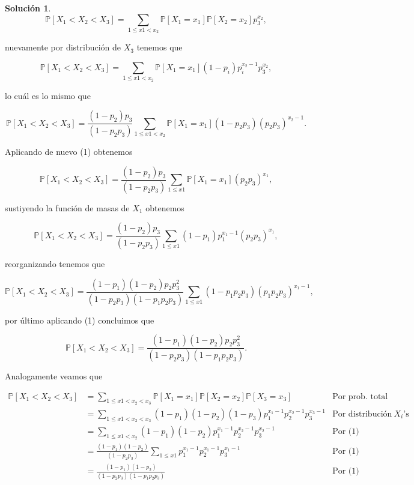 \documentclass[letterpaper]{article}
\theoremstyle{definition}
\theoremstyle{lemathm}
\theoremstyle{lemathm}
\newtheorem{sol}{Solución}
\theoremstyle{lemathm}
\theoremstyle{lemademthm}
\newcommand{\pars}[1]{\left( #1 \right) }
\newcommand{\bracs}[1]{\left[ #1 \right] }
\newcommand{\PP}{\mathbb{P}}
\newcommand{\1}{\mathbbm{1}}
\begin{document}
\begin{enumerate}
\begin{sol}
			\[\PP\bracs{X_1 < X_2 < X_3} = \sum_{1 \leq x1 < x_2} \PP\bracs{X_1 = x_1}\PP\bracs{X_2 = x_2}p_3^{x_2},\]

			nuevamente por distribución de $X_3$ tenemos que

			\[\PP\bracs{X_1 < X_2 < X_3} = \sum_{1 \leq x1 < x_2} \PP\bracs{X_1 = x_1}\pars{1-p_i}p_i^{x_2-1}p_3^{x_2},\]

			lo cuál es lo mismo que

			\[\PP\bracs{X_1 < X_2 < X_3} = \frac{\pars{1-p_2}p_3}{\pars{1-p_2p_3}}\sum_{1 \leq x1 < x_2} \PP\bracs{X_1 = x_1}\pars{1-p_2p_3}\pars{p_2p_3}^{x_2-1}.\]

			Aplicando de nuevo (1) obtenemos

			\[\PP\bracs{X_1 < X_2 < X_3} = \frac{\pars{1-p_2}p_3}{\pars{1-p_2p_3}}\sum_{1 \leq x1} \PP\bracs{X_1 = x_1}\pars{p_2p_3}^{x_1},\]

			sustiyendo la función de masas de $X_1$ obtenemos

			\[\PP\bracs{X_1 < X_2 < X_3} = \frac{\pars{1-p_2}p_3}{\pars{1-p_2p_3}}\sum_{1 \leq x1} \pars{1-p_1}p_1^{x_1-1}\pars{p_2p_3}^{x_1},\]

			reorganizando tenemos que

			\[\PP\bracs{X_1 < X_2 < X_3} = \frac{\pars{1-p_1}\pars{1-p_2}p_2p_3^2}{\pars{1-p_2p_3}\pars{1-p_1p_2p_3}}\sum_{1 \leq x1} \pars{1-p_1p_2p_3}\pars{p_1p_2p_3}^{x_1-1},\]

			por último aplicando (1) concluimos que

			\[\PP\bracs{X_1 < X_2 < X_3} = \frac{\pars{1-p_1}\pars{1-p_2}p_2p_3^2}{\pars{1-p_2p_3}\pars{1-p_1p_2p_3}}.\]

			Analogamente veamos que

			\begin{align*}
				\PP\bracs{X_1 < X_2 < X_3} &= \sum_{1\leq x1 < x_2 < x_3} \PP\bracs{X_1 = x_1}\PP\bracs{X_2 = x_2}\PP\bracs{X_3 = x_3} & \text{Por prob. total e indep.}\\
				&= \sum_{1\leq x1 < x_2 < x_3} \pars{1-p_1}\pars{1-p_2}\pars{1-p_3}p_1^{x_1-1}p_2^{x_2-1}p_3^{x_3-1} & \text{Por distribución de las $X_i$'s}\\
				&= \sum_{1\leq x1 < x_2} \pars{1-p_1}\pars{1-p_2}p_1^{x_1-1}p_2^{x_2-1}p_3^{x_2-1} & \text{Por (1)}\\
				&= \frac{\pars{1-p_1}\pars{1-p_2}}{\pars{1-p_2p_3}}\sum_{1\leq x1} p_1^{x_1-1}p_2^{x_1-1}p_3^{x_1-1} & \text{Por (1)}\\
				&= \frac{\pars{1-p_1}\pars{1-p_2}}{\pars{1-p_2p_3}\pars{1-p_1p_2p_3}} & \text{Por (1)}
			\end{align*}
		\end{sol}


\end{enumerate}
\end{document}
